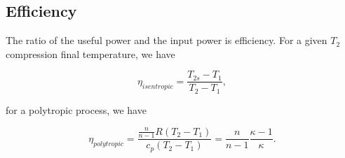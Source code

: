 \subsection{Efficiency}

The ratio of the useful power and the input power is efficiency. For a given $T_2$ compression final temperature, we have

\begin{equation}
\eta_{isentropic}=\frac{T_{2s}-T_1}{T_2-T_1},
\end{equation}

\noindent for a polytropic process, we have

\begin{equation}
\eta_{polytropic}=\frac{\frac{n}{n-1}R (T_2-T_1)}{c_p(T_2-T_1)}=\frac{n}{n-1}\frac{\kappa-1}{\kappa}.
\end{equation}




\clearpage

